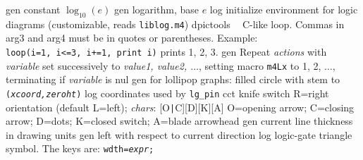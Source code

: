 %
  {gen}%
  {constant $\log_{10}(e)$}%
%
  {gen}%
  {logarithm, base $e$}%
%
  {log}%
  {initialize environment for logic diagrams
    (customizable, reads {\tt liblog.m4})}%
%
  {dpictools}%
  {$\;\;$ C-like loop.  Commas in arg3 and arg4 must
    be in quotes or parentheses. Example:\\
    {\tt loop(i=1, i<=3, i+=1, print i)} prints 1, 2, 3.}%
%
  {gen}%
  {Repeat {\sl actions} with {\sl variable} set successively to
   {\sl value1, value2, $\ldots$}, setting macro {\tt m4Lx} to 1, 2,
   $\ldots$, terminating if {\sl variable} is nul}%
 {gen}%
  {for lollipop graphs: filled circle with stem to
    {\tt ({\sl xcoord,zeroht})}}%
%
  {log}%
  {coordinates used by {\tt lg\_pin}}%
%
  {cct}%
  {knife switch R=right orientation (default L=left);
    {\sl chars}: [O{\tt|}C][D][K][A] O=opening arrow; C=closing arrow;
    D=dots; K=closed switch; A=blade arrowhead }%
%
  {gen}%
  {current line thickness in drawing units}%
%
  {gen}%
  {left with respect to current direction}%
%
  {log}%
  {logic-gate triangle symbol. The keys are:
    {\tt wdth={\sl expr};}}%

%

